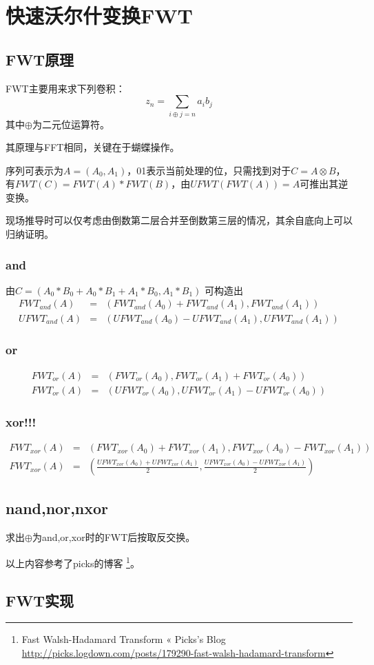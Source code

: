 \section{快速沃尔什变换FWT}
\subsection{FWT原理}
FWT主要用来求下列卷积：
\begin{displaymath}
    z_n=\sum_{i\oplus j=n}{a_ib_j}
\end{displaymath}
其中$\oplus$为二元位运算符。

其原理与FFT相同，关键在于蝴蝶操作。

序列可表示为$A=(A_0,A_1)$，01表示当前处理的位，只需找到对于$C=A\otimes B$，
有$FWT(C)=FWT(A)*FWT(B)$，由$UFWT(FWT(A))=A$可推出其逆变换。


现场推导时可以仅考虑由倒数第二层合并至倒数第三层的情况，其余自底向上可以归纳证明。

\subsubsection{and}
由$C=(A_0*B_0+A_0*B_1+A_1*B_0,A_1*B_1)$
可构造出
\begin{eqnarray*}
    FWT_{and}(A)&=&(FWT_{and}(A_0)+FWT_{and}(A_1),FWT_{and}(A_1))\\
    UFWT_{and}(A)&=&(UFWT_{and}(A_0)-UFWT_{and}(A_1),UFWT_{and}(A_1))
\end{eqnarray*}
\subsubsection{or}
\begin{eqnarray*}
    FWT_{or}(A)&=&(FWT_{or}(A_0),FWT_{or}(A_1)+FWT_{or}(A_0))\\
    FWT_{or}(A)&=&(UFWT_{or}(A_0),UFWT_{or}(A_1)-UFWT_{or}(A_0))
\end{eqnarray*}
\subsubsection{xor!!!}
\begin{eqnarray*}
    FWT_{xor}(A)&=&(FWT_{xor}(A_0)+FWT_{xor}(A_1),FWT_{xor}(A_0)-FWT_{xor}(A_1))\\
    FWT_{xor}(A)&=&\left(\frac{UFWT_{xor}(A_0)+UFWT_{xor}(A_1)}{2},
    \frac{UFWT_{xor}(A_0)-UFWT_{xor}(A_1)}{2}\right)
\end{eqnarray*}
\subsection{nand,nor,nxor}
求出$\oplus$为and,or,xor时的FWT后按取反交换。

以上内容参考了picks的博客
\footnote{Fast Walsh-Hadamard Transform « Picks's Blog
    \url{http://picks.logdown.com/posts/179290-fast-walsh-hadamard-transform}}。
\subsection{FWT实现}

